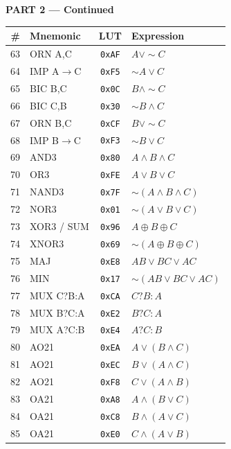 \documentclass[10pt,landscape,a4paper]{article}
\begin{document}
\begin{minipage}[t]{0.25\textwidth}
        \textbf{\large \textcolor{logiccolor}{PART 2 --- Continued}} \\[0.75em]
    \scriptsize
    \begin{tabular}{@{}rlcl@{}}
    \toprule
    \textbf{\#} & \textbf{Mnemonic} & \textbf{LUT} & \textbf{Expression} \\
    \midrule
    63 & ORN A,C & \texttt{0xAF} & $A \vee \sim C$ \\
    64 & IMP A$\to$C & \texttt{0xF5} & $\sim A \vee C$ \\
    65 & BIC B,C & \texttt{0x0C} & $B \wedge \sim C$ \\
    66 & BIC C,B & \texttt{0x30} & $\sim B \wedge C$ \\
    67 & ORN B,C & \texttt{0xCF} & $B \vee \sim C$ \\
    68 & IMP B$\to$C & \texttt{0xF3} & $\sim B \vee C$ \\
    69 & AND3 & \texttt{0x80} & $A \wedge B \wedge C$ \\
    70 & OR3 & \texttt{0xFE} & $A \vee B \vee C$ \\
    71 & NAND3 & \texttt{0x7F} & $\sim(A \wedge B \wedge C)$ \\
    72 & NOR3 & \texttt{0x01} & $\sim(A \vee B \vee C)$ \\
    73 & XOR3 / SUM & \texttt{0x96} & $A \oplus B \oplus C$ \\
    74 & XNOR3 & \texttt{0x69} & $\sim(A \oplus B \oplus C)$ \\
    75 & MAJ & \texttt{0xE8} & $AB \vee BC \vee AC$ \\
    76 & MIN & \texttt{0x17} & $\sim(AB \vee BC \vee AC)$ \\
    77 & MUX C?B:A & \texttt{0xCA} & $C ? B : A$ \\
    78 & MUX B?C:A & \texttt{0xE2} & $B ? C : A$ \\
    79 & MUX A?C:B & \texttt{0xE4} & $A ? C : B$ \\
    80 & AO21 & \texttt{0xEA} & $A \vee (B \wedge C)$ \\
    81 & AO21 & \texttt{0xEC} & $B \vee (A \wedge C)$ \\
    82 & AO21 & \texttt{0xF8} & $C \vee (A \wedge B)$ \\
    83 & OA21 & \texttt{0xA8} & $A \wedge (B \vee C)$ \\
    84 & OA21 & \texttt{0xC8} & $B \wedge (A \vee C)$ \\
    85 & OA21 & \texttt{0xE0} & $C \wedge (A \vee B)$ \\

\end{tabular}
\end{minipage}
\end{document}
